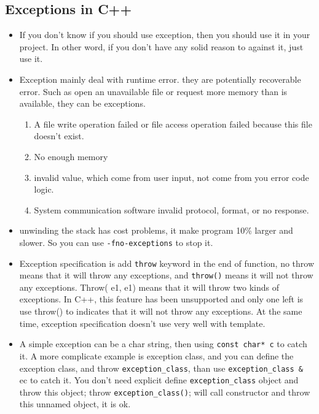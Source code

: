 \documentclass[a4paper,11pt,twoside]{book}
\begin{document}
\subsection{Exceptions in C++}
\begin{itemize}
	\item If you don't know if you should use exception, then you should use it in your project. In other word, if you don't have any solid reason to against it, just use it.
	
	\item Exception mainly deal with runtime error. they are potentially recoverable error.  Such as open an unavailable file or request more memory than is available, they can be exceptions.
	
	
	\begin{enumerate}
		\item A file write operation failed or file access operation failed because this file doesn't exist.
		
		\item No enough memory
		
		\item invalid value, which come from user input, not come from you error code logic.
		
		\item System communication software invalid protocol, format, or no response.
	\end{enumerate}
	
	\item unwinding the stack has cost problems, it make program 10\% larger and slower. So you can use \texttt{-fno-exceptions} to stop it.
	
	\item Exception specification is add \texttt{throw} keyword in the end of function, no throw means that it will throw any exceptions, and \texttt{throw()} means it will not throw any exceptions. Throw( e1, e1) means that it will throw two kinds of exceptions. In C++, this feature has been unsupported and only one left is use throw() to indicates that it will not throw any exceptions.  At the same time, exception specification doesn't use very well with template.
	
	\item A simple exception can be a char string, then using \texttt{const char* c} to catch it. A more complicate example is exception class, and you can define the exception class, and throw \texttt{exception\_class}, than use \texttt{exception\_class \& }ec to catch it.  You don't need explicit define \texttt{exception\_class} object and throw this object; throw \texttt{exception\_class()}; will call constructor and throw this unnamed object, it is ok.
	

\end{itemize}
\end{document}

